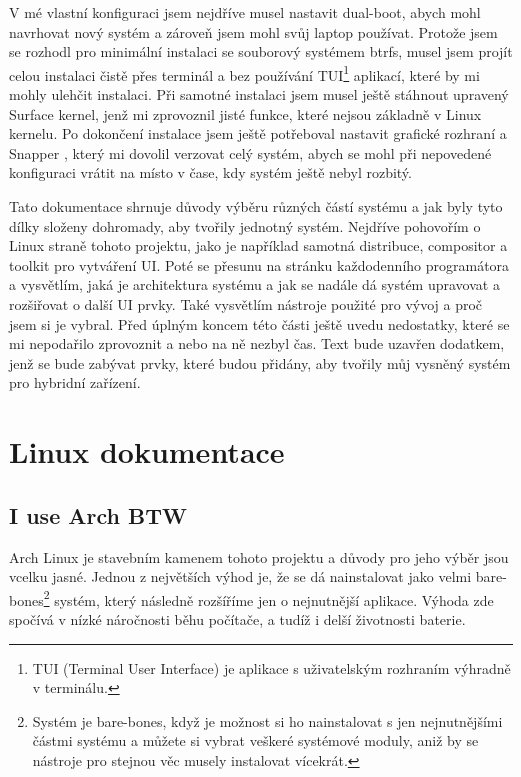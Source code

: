 \documentclass[12pt,a4paper]{article}
\begin{document}
V mé vlastní konfiguraci jsem nejdříve musel nastavit dual-boot, abych mohl navrhovat nový systém a
zároveň jsem mohl svůj laptop používat. Protože jsem se rozhodl pro minimální instalaci se souborový systémem btrfs,
musel jsem projít celou instalaci čistě přes terminál a bez používání TUI\footnote{TUI (Terminal User Interface) je 
aplikace s uživatelským rozhraním výhradně v terminálu.} 
aplikací, které by mi mohly ulehčit instalaci. Při samotné instalaci jsem musel ještě stáhnout
upravený Surface kernel, jenž mi zprovoznil jisté funkce, které nejsou základně v Linux kernelu.
Po dokončení instalace jsem ještě potřeboval nastavit grafické rozhraní a Snapper
\autocite{SnapperUltimateSnapshot}, který mi dovolil verzovat celý systém, abych se mohl při nepovedené 
konfiguraci vrátit na místo v čase, kdy systém ještě nebyl rozbitý.

Tato dokumentace shrnuje důvody výběru různých částí systému a jak byly tyto dílky složeny dohromady, aby
tvořily jednotný systém. Nejdříve pohovořím o Linux straně tohoto projektu, jako je například samotná
distribuce, compositor a toolkit pro vytváření UI. Poté se přesunu na stránku každodenního programátora a
vysvětlím, jaká je architektura systému a jak se nadále dá systém upravovat a rozšiřovat o další UI prvky.
Také vysvětlím nástroje použité pro vývoj a proč jsem si je vybral. Před úplným koncem této části
ještě uvedu nedostatky, které se mi nepodařilo zprovoznit a nebo na ně nezbyl čas. Text bude uzavřen
dodatkem, jenž se bude zabývat prvky, které budou přidány, aby tvořily můj vysněný systém pro
hybridní zařízení.


\newpage
\section{Linux dokumentace}

\subsection{I use Arch BTW}
Arch Linux \autocite{ArchWiki} je stavebním kamenem tohoto projektu a důvody pro jeho výběr jsou vcelku jasné. Jednou z 
největších výhod je, že se dá nainstalovat jako velmi bare-bones\footnote{Systém je bare-bones, když je možnost
si ho nainstalovat s jen nejnutnějšími částmi systému a můžete si vybrat veškeré systémové moduly,
aniž by se nástroje pro stejnou věc musely instalovat vícekrát.} systém, který následně
rozšíříme jen o nejnutnější aplikace. Výhoda zde spočívá v nízké náročnosti běhu počítače, a tudíž i
delší životnosti baterie.
\end{document}
